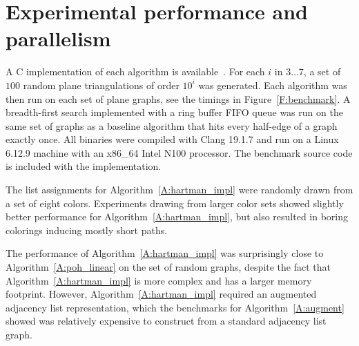 \documentclass[12pt,letterpaper]{article}
\theoremstyle{plain}
\theoremstyle{definition}
\theoremstyle{break}
\begin{document}
\section{Experimental performance and parallelism}

A C implementation of each algorithm is available~\cite{Bro2017}.
For each $i$ in $3\ldots 7$, a set of $100$ random plane triangulations
of order $10^i$ was
generated. Each algorithm was then run on each set of plane graphs,
see the timings in Figure~\ref{F:benchmark}.
A breadth-first search implemented with
a ring buffer FIFO queue was run on the same set of graphs
as a baseline
algorithm that hits every half-edge of a graph exactly once.
All binaries 
were compiled with Clang 19.1.7 and run on a Linux 6.12.9 machine
with an x86\_64 Intel N100 processor.
The benchmark
source code is included with the implementation.

The list assignments for Algorithm~\ref{A:hartman_impl} were randomly
drawn from a set of eight colors. Experiments drawing from larger color sets
showed slightly better performance for Algorithm~\ref{A:hartman_impl}, but also
resulted in boring colorings inducing mostly short paths.

The performance of
Algorithm~\ref{A:hartman_impl} was surprisingly close to
Algorithm~\ref{A:poh_linear} on the set of random graphs, despite the fact that
Algorithm~\ref{A:hartman_impl} is more complex and has a larger memory
footprint.
However, Algorithm~\ref{A:hartman_impl} required an augmented adjacency list
representation, which the benchmarks for Algorithm~\ref{A:augment} showed
was relatively expensive to construct from a standard adjacency list graph.
\end{document}
